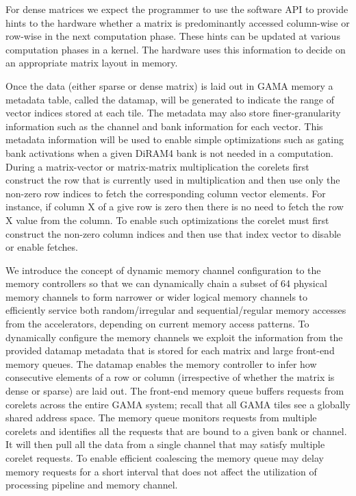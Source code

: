 For dense matrices we expect the programmer to use the software API to provide hints to the hardware whether a matrix is predominantly  accessed column-wise or row-wise in the next computation phase. These hints can be updated at various computation phases in a  kernel. The hardware uses this information to decide on an appropriate matrix layout in memory. 

Once the data (either sparse or dense matrix) is laid out in GAMA memory a metadata table, called the datamap, will be generated to indicate the range of vector indices stored at each tile.  The metadata may also store finer-granularity information such as the channel and bank information for each vector. This metadata information will be used to enable simple optimizations such as gating bank activations when a given DiRAM4 bank is not needed in a computation.    
During a matrix-vector or matrix-matrix multiplication the corelets first construct the row that is currently used in multiplication and then use only the non-zero row indices to fetch the corresponding column vector elements. For instance, if column X of a give row is zero then there is no need to fetch the row X value from the column. To enable such optimizations the corelet must first construct the non-zero column indices and then use that index vector to disable or enable fetches. 

  
We introduce the concept of dynamic memory channel configuration to the memory controllers so that we can dynamically chain a subset of  64 physical memory channels to form narrower or wider logical memory channels to efficiently service both random/irregular and sequential/regular memory accesses from the accelerators, depending on current memory access patterns. To  dynamically configure the memory channels we exploit the information from the provided datamap metadata that is stored for each matrix and large front-end memory queues. The datamap enables the memory controller to infer how  consecutive elements of a row or column (irrespective of whether the matrix is dense or sparse) are laid out. The  front-end memory queue buffers requests from  corelets across the entire GAMA system; recall that all GAMA tiles see a globally shared address space. The memory queue monitors requests from multiple corelets and identifies all the requests that are bound to a given bank or channel. It will then pull all the data from a single channel that may satisfy multiple corelet requests.  To enable efficient coalescing the memory queue may delay memory requests for a short interval that  does not affect the utilization of processing pipeline and memory channel. 


